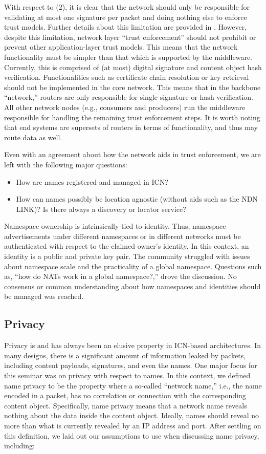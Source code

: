 With respect to (2), it is clear that the network should only be responsible for
validating at most one signature per packet and doing nothing else to enforce
trust models. Further details about this limitation are provided in \cite{trust}.
However, despite this limitation, network layer ``trust enforcement'' should not prohibit or prevent other
application-layer trust models. This means that the network functionality must be simpler than
that which is supported by the middleware. Currently, this is comprised of (at most) digital
signature and content object hash verification. Functionalities such as certificate chain
resolution or key retrieval should not be implemented in the core network. This means that
in the backbone ``network,'' routers are only responsible for single signature or hash
verification. All other network nodes (e.g., consumers and producers) run the middleware
responsible for handling the remaining trust enforcement steps. It is worth noting that
end systems are supersets of routers in terms of functionality, and thus may route data as well.

Even with an agreement about how the network aids in trust enforcement, we are
left with the following major questions:
%
\begin{itemize}
\item How are names registered and managed in ICN?
\item How can names possibly be location agnostic (without aids such as the NDN LINK)?
Is there always a discovery or locator service?
\end{itemize}
%
Namespace ownership is intrinsically tied to identity. Thus, namespace advertisements under
different namespaces or in different networks must be authenticated with respect to the
claimed owner's identity. In this context, an identity is a public and private key pair.
The community struggled with issues about namespace scale and the practicality of a global
namespace. Questions such as, ``how do NATs work in a global namespace?,'' drove the
discussion. No consensus or common understanding about how namespaces and identities
should be managed was reached.

\subsection{Privacy}
Privacy is and has always been an elusive property in ICN-based architectures.
In many designs, there is a significant amount of information leaked by packets, including
content payloads, signatures, and even the names. One major focus for this seminar
was on privacy with respect to names. In this context, we defined name privacy to be the property
where a so-called ``network name,'' i.e., the name encoded in a packet, has no correlation
or connection with the corresponding content object. Specifically, name privacy means
that a network name reveals nothing about the data inside the content object. Ideally,
names should reveal no more than what is currently revealed by an IP address and port.
After settling on this definition, we laid out our assumptions to use when discussing
name privacy, including:

